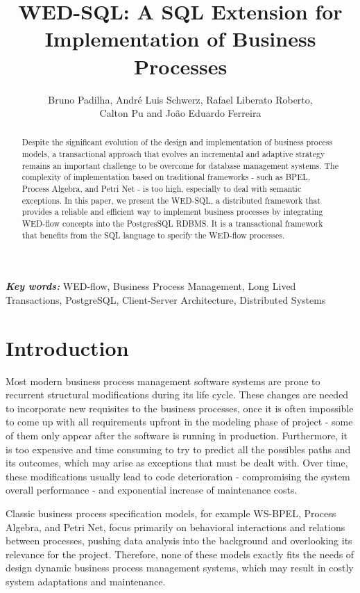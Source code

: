 \documentclass[12pt]{article}
\title{WED-SQL: A SQL Extension for Implementation of Business Processes}
\author{Bruno Padilha\inst{1}, André Luis Schwerz\inst{2}, Rafael Liberato Roberto\inst{2},\\ Calton Pu\inst{3} and João Eduardo Ferreira\inst{1}}
\providecommand{\keywords}[1]{\textbf{\textit{Key words: }} #1}
\begin{document}
 

\maketitle

\begin{abstract}
Despite the significant evolution of the design and implementation of business process models, a transactional approach that evolves an incremental and adaptive strategy remains an important challenge to be overcome for database management systems. The complexity of implementation based on traditional frameworks - such as BPEL, Process Algebra, and Petri Net - is too high, especially to deal with semantic exceptions. In this paper, we present the WED-SQL, a distributed framework that provides a reliable and efficient way to implement business processes by integrating WED-flow concepts into the PostgresSQL RDBMS. It is a transactional framework that benefits from the SQL language to specify the WED-flow processes. 
\end{abstract}
\keywords{WED-flow, Business Process Management, Long Lived Transactions, PostgreSQL, Client-Server Architecture, Distributed Systems}
     
\section{Introduction}

Most  modern business process management software systems are prone  to recurrent structural modifications during its life cycle. These  changes are needed to incorporate new requisites to the business processes, once it is often impossible  to come up with all requirements upfront in the modeling phase of project - some of them only appear after the software is running in production. Furthermore, it is too expensive and time consuming to try to predict all the possibles paths  and its outcomes, which may arise as exceptions that must be dealt with. Over time, these modifications usually lead to code deterioration - compromising the system overall performance - and exponential increase of maintenance costs.

Classic business process specification models, for example WS-BPEL, Process Algebra, and Petri Net, focus primarily on behavioral interactions and relations between processes, pushing data analysis into the background and overlooking its relevance for the project. Therefore, none of these models exactly fits the needs of design dynamic business process management systems, which may result in costly system adaptations and maintenance.
\end{document}
